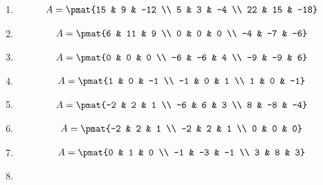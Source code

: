 \begin{enumerate}
\item

\begin{align*}
A = \pmat{15 & 9 & -12 \\ 5 & 3 & -4 \\ 22 & 15 & -18}
\end{align*}

\item

\begin{align*}
A = \pmat{6 & 11 & 9 \\ 0 & 0 & 0 \\ -4 & -7 & -6}
\end{align*}

\item

\begin{align*}
A = \pmat{0 & 0 & 0 \\ -6 & -6 & 4 \\ -9 & -9 & 6}
\end{align*}

\item

\begin{align*}
A = \pmat{1 & 0 & -1 \\ -1 & 0 & 1 \\ 1 & 0 & -1}
\end{align*}

\item

\begin{align*}
A = \pmat{-2 & 2 & 1 \\ -6 & 6 & 3 \\ 8 & -8 & -4}
\end{align*}

\item

\begin{align*}
A = \pmat{-2 & 2 & 1 \\ -2 & 2 & 1 \\ 0 & 0 & 0}
\end{align*}

\item

\begin{align*}
A = \pmat{0 & 1 & 0 \\ -1 & -3 & -1 \\ 3 & 8 & 3}
\end{align*}

\item


\end{enumerate}
